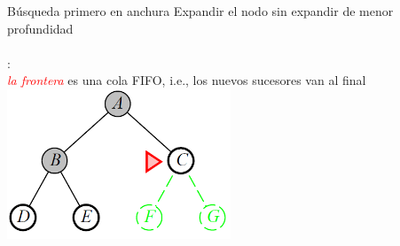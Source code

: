 \begin{frame}{B\'usqueda primero en anchura}
    Expandir el nodo sin expandir de menor profundidad\\~\\
    :\\
    \quad\textcolor{red}{\textit{la frontera}} es una cola FIFO, i.e., los nuevos sucesores van al final
    \centering
    \includegraphics[width=0.5\textwidth]{35_image_bfs2.PNG}

\end{frame}
